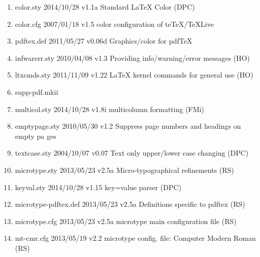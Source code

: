 \begin{enumerate}
\item color.sty 2014/10/28 v1.1a Standard LaTeX Color (DPC)
\item color.cfg 2007/01/18 v1.5 color configuration of teTeX/TeXLive
\item pdftex.def 2011/05/27 v0.06d Graphics/color for pdfTeX
\item infwarerr.sty 2010/04/08 v1.3 Providing info/warning/error messages (HO)
\item ltxcmds.sty 2011/11/09 v1.22 LaTeX kernel commands for general use (HO)
\item supp-pdf.mkii
\item multicol.sty 2014/10/28 v1.8i multicolumn formatting (FMi)
\item emptypage.sty 2010/05/30 v1.2 Suppress page numbers and headings on empty pa
ges
\item textcase.sty 2004/10/07 v0.07 Text only upper/lower case changing (DPC)


\item 	microtype.sty 2013/05/23 v2.5a Micro-typographical refinements (RS)
\item 	keyval.sty 2014/10/28 v1.15 key=value parser (DPC)
\item 	microtype-pdftex.def 2013/05/23 v2.5a Definitions specific to pdftex (RS)
\item 	microtype.cfg 2013/05/23 v2.5a microtype main configuration file (RS)
\item 	mt-cmr.cfg 2013/05/19 v2.2 microtype config. file: Computer Modern Roman (RS)


\end{enumerate}
